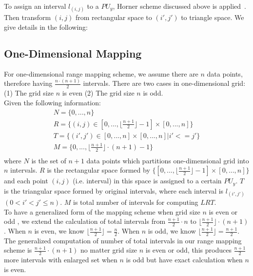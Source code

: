 \documentclass[AMA,LATO1COL]{WileyNJD-v2}
\begin{document}
To assign an interval $l_(i,j)$ to a $PU_y$, Horner scheme discussed above is applied~\cite{horner}. Then transform $(i,j)$ from rectangular space to $(i',j')$  to triangle space. We give details in the following:

\subsection{One-Dimensional Mapping}
For one-dimensional range mapping scheme, we assume there are $n$ data points, therefore having ${\frac{n \cdot (n+1)}{2}}$ intervals. There are two cases in one-dimensional grid: (1) The grid size $n$ is even (2) The grid size $n$ is odd. \\

Given the following information:
\begin{eqnarray}
& N = \{0,...,n\}               & \\
& R = \{(i,j)\in [0,...,\lfloor \frac{n+1}{2}\rfloor -1] \times [0,...,n]\}     &\\
& T = \{(i',j') \in [0,...,n] \times [0,...,n] | i'<=j'\}   &\\
& M = \{0,..., \lfloor \frac{n+1}{2}\rfloor \cdot (n+1)-1\}  &\\
\end{eqnarray}
where  $ N$ is the set of $n+1$ data points which partitions one-dimensional grid into $n$ intervals. $ R$ is the rectangular space formed by $\{[0,...,\lfloor \frac{n+1}{2}\rfloor -1]\times [0,...,n]\}$ and each point $(i,j)$ (i.e. interval) in this space is assigned to a certain $PU_y$. $T$ is the triangular space formed by original intervals, where each interval is $l_(i',j')$ $(0<i'<j'\leq n)$. $ M$ is total number of  intervals for computing $LRT$.\\
 To have a generalized form of the mapping scheme when grid size $n$ is even or odd , we extend the calculation of total intervals from $\frac{n+1}{2} \cdot n$ to $\lfloor \frac{n+1}{2}\rfloor \cdot (n+1)$. When $n$ is even, we know $\lfloor \frac{n+1}{2}\rfloor =\frac{n}{2}$. When $n$ is odd, we know $\lfloor \frac{n+1}{2}\rfloor= \frac{n+1}{2}$. The generalized computation of number of total intervals in our range mapping scheme is $\frac{n+1}{2} \cdot (n+1) $ no matter grid size $n$ is even or odd, this produces $\frac{n+1}{2}$ more intervals with enlarged set when $n$ is odd but have exact calculation when $n$ is even. \\
\end{document}
